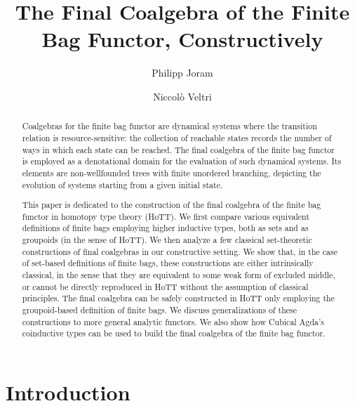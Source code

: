 \documentclass[runningheads]{llncs}
\begin{document}
\title{The Final Coalgebra of the Finite Bag Functor, Constructively}
\author{%
    Philipp Joram \and
    Niccolò Veltri%
}
%

\maketitle              %

\begin{abstract}

  Coalgebras for the finite bag functor are dynamical systems where the transition relation is resource-sensitive: the collection of reachable states records the number of ways in which each state can be reached. The final coalgebra of the finite bag functor is employed as a denotational domain for the evaluation of such dynamical systems. Its elements are non-wellfounded trees with finite unordered branching, depicting the evolution of systems starting from a given initial state.

  This paper is dedicated to the construction of the final coalgebra of the finite bag functor in homotopy type theory (HoTT). We first compare various equivalent definitions of finite bags employing higher inductive types, both as sets and as groupoids (in the sense of HoTT). We then analyze a few classical set-theoretic constructions of final coalgebras in our constructive setting. We show that, in the case of set-based definitions of finite bags, these constructions are either intrinsically classical, in the sense that they are equivalent to some weak form of excluded middle, or cannot be directly reproduced in HoTT without the assumption of classical principles. The final coalgebra can be safely constructed in HoTT only employing the groupoid-based definition of finite bags. We discuss generalizations of these constructions to more general analytic functors. We also show how Cubical Agda's coinductive types can be used to build the final coalgebra of the finite bag functor. 

\end{abstract}

\section{Introduction}
\end{document}
